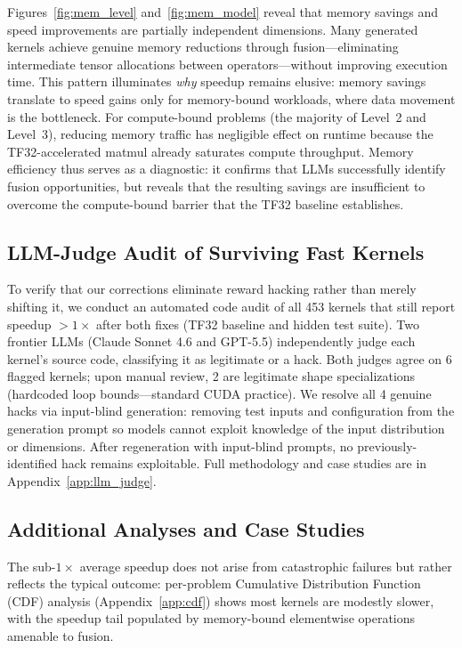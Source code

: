 \documentclass[]{fairmeta}
\begin{document}
Figures~\ref{fig:mem_level} and~\ref{fig:mem_model} reveal that memory savings and speed improvements are partially independent dimensions. Many generated kernels achieve genuine memory reductions through fusion---eliminating intermediate tensor allocations between operators---without improving execution time. This pattern illuminates \emph{why} speedup remains elusive: memory savings translate to speed gains only for memory-bound workloads, where data movement is the bottleneck. For compute-bound problems (the majority of Level~2 and Level~3), reducing memory traffic has negligible effect on runtime because the TF32-accelerated matmul already saturates compute throughput. Memory efficiency thus serves as a diagnostic: it confirms that LLMs successfully identify fusion opportunities, but reveals that the resulting savings are insufficient to overcome the compute-bound barrier that the TF32 baseline establishes.




\subsection{LLM-Judge Audit of Surviving Fast Kernels}

To verify that our corrections eliminate reward hacking rather than merely shifting it, we conduct an automated code audit of all 453 kernels that still report speedup $> 1\times$ after both fixes (TF32 baseline and hidden test suite). Two frontier LLMs (Claude Sonnet 4.6 and GPT-5.5) independently judge each kernel's source code, classifying it as legitimate or a hack. Both judges agree on 6 flagged kernels; upon manual review, 2 are legitimate shape specializations (hardcoded loop bounds---standard CUDA practice). We resolve all 4 genuine hacks via input-blind generation: removing test inputs and configuration from the generation prompt so models cannot exploit knowledge of the input distribution or dimensions. After regeneration with input-blind prompts, no previously-identified hack remains exploitable. Full methodology and case studies are in Appendix~\ref{app:llm_judge}.

\subsection{Additional Analyses and Case Studies}

The sub-$1\times$ average speedup does not arise from catastrophic failures but rather reflects the typical outcome: per-problem Cumulative Distribution Function (CDF) analysis (Appendix~\ref{app:cdf}) shows most kernels are modestly slower, with the speedup tail populated by memory-bound elementwise operations amenable to fusion.
\end{document}
